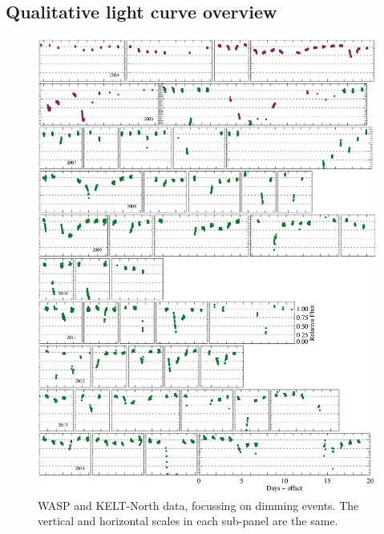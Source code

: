 \documentclass[useAMS,usenatbib,usegraphicx]{mn2e}
\begin{document}
\subsection{Qualitative light curve overview}\label{ss:quallc}

\begin{figure}
  \begin{center}
    \hspace{-0.5cm} \includegraphics[width=\textwidth]{figs/yearly-zoom.eps}
    \caption{WASP and KELT-North data, focussing on dimming events. The vertical and
      horizontal scales in each sub-panel are the same.}\label{fig:waspkeltzoom}
  \end{center}
\end{figure}
\end{document}
